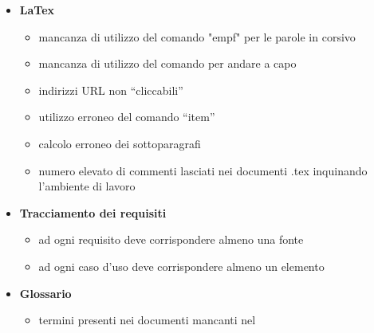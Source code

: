 \begin{itemize}
\item \textbf{LaTex}

	\begin{itemize}
	
	\item mancanza di utilizzo del comando "empf" per le parole in corsivo
	\item mancanza di utilizzo del comando per andare a capo
	\item indirizzi URL non “cliccabili”
	\item utilizzo erroneo del comando “item”
	\item calcolo erroneo dei sottoparagrafi 
	\item numero elevato di commenti lasciati nei documenti .tex inquinando l’ambiente di lavoro
	
	\end{itemize}



\item \textbf{Tracciamento dei requisiti}

	\begin{itemize}
	\item ad ogni requisito deve corrispondere almeno una fonte
	\item ad ogni caso d’uso deve corrispondere almeno un elemento
	\end{itemize}


\item \textbf{Glossario}

	\begin{itemize}
	\item termini presenti nei documenti mancanti nel \gloss
	\end{itemize}



\end{itemize}






































